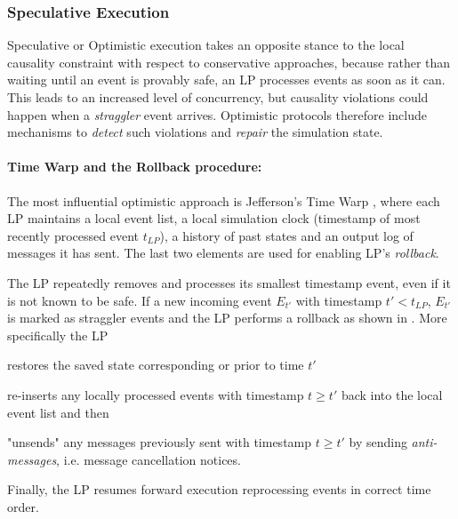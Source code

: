 \subsubsection{Speculative Execution}\label{sssec:speculative_pdes}

Speculative or Optimistic execution takes an opposite stance to the local causality
constraint with respect to conservative approaches, because rather than waiting until
an event is provably safe, an \ac{LP} processes events as soon as it can. This leads
to an increased level of concurrency, but causality violations could happen when
a \emph{straggler} event arrives. Optimistic protocols therefore include mechanisms
to \emph{detect} such violations and \emph{repair} the simulation state.

\paragraph{Time Warp and the Rollback procedure:}
The most influential optimistic approach is Jefferson's Time
Warp \cite{jefferson1987TWOS}, where each \ac{LP} maintains a local event list,
a local simulation clock (timestamp of most recently processed event $t_{LP}$), a
history of past states and an output log of messages it has sent. The last two
elements are used for enabling \ac{LP}'s \emph{rollback}.

The \ac{LP} repeatedly removes and processes its smallest timestamp event, even if it
is not known to be safe. If a new incoming event $E_{t'}$ with timestamp $t' < t_{LP}$,
$E_{t'}$ is marked as straggler events and the \ac{LP} performs a rollback as shown in
.
%
%
More specifically the \ac{LP}
%
\begin{enumerate*}[label=(\roman*)]
	\item restores the saved state corresponding or prior to time $t'$
	\item re-inserts any locally processed events with timestamp $t \geq t'$
	      back into the local event list and then
	\item "unsends" any messages previously sent with timestamp $t \geq t'$ by
	      sending \emph{anti-messages}, i.e. message cancellation notices.
\end{enumerate*}
%
Finally, the LP resumes forward execution reprocessing events in correct time
order.

